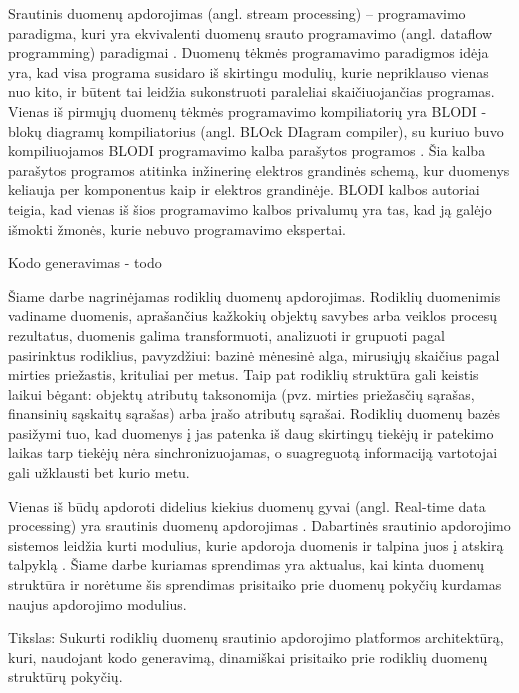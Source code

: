 \documentclass{VUMIFPSbakalaurinis}
\begin{document}
Srautinis duomenų apdorojimas (angl. stream processing) – programavimo paradigma, kuri yra ekvivalenti duomenų srauto programavimo (angl. dataflow programming) paradigmai \cite{shortstreamproc}. 
Duomenų tėkmės programavimo paradigmos idėja yra, kad visa programa susidaro iš skirtingu modulių, kurie nepriklauso vienas nuo kito, ir būtent tai leidžia sukonstruoti paraleliai skaičiuojančias programas. 
Vienas iš pirmųjų duomenų tėkmės programavimo kompiliatorių yra BLODI - blokų diagramų kompiliatorius (angl. BLOck DIagram compiler), su kuriuo buvo kompiliuojamos 
BLODI programavimo kalba parašytos programos \cite{kelly1961block}.  Šia kalba parašytos programos atitinka inžinerinę elektros grandinės schemą, 
kur duomenys keliauja per komponentus kaip ir elektros grandinėje. BLODI kalbos autoriai teigia, kad vienas iš šios programavimo kalbos privalumų yra tas, 
kad ją galėjo išmokti žmonės, kurie nebuvo programavimo ekspertai.\par
Kodo generavimas - todo \par
Šiame darbe nagrinėjamas rodiklių duomenų apdorojimas. Rodiklių duomenimis vadiname duomenis, aprašančius kažkokių objektų savybes arba veiklos procesų rezultatus, 
duomenis galima transformuoti, analizuoti ir grupuoti pagal pasirinktus rodiklius, 
pavyzdžiui: bazinė mėnesinė alga, mirusiųjų skaičius pagal mirties priežastis, krituliai per metus. Taip pat rodiklių struktūra gali keistis laikui bėgant: 
objektų atributų taksonomija (pvz. mirties priežasčių sąrašas, finansinių sąskaitų sąrašas) arba įrašo atributų sąrašai.
Rodiklių duomenų bazės pasižymi tuo, kad duomenys į jas patenka iš daug skirtingų tiekėjų ir patekimo laikas tarp tiekėjų nėra 
sinchronizuojamas, o suagreguotą informaciją vartotojai gali užklausti bet kurio metu.  \par
Vienas iš būdų apdoroti didelius kiekius duomenų gyvai (angl. Real-time data processing) yra srautinis duomenų apdorojimas \cite{BigData, StreamProcessingInData}. 
Dabartinės srautinio apdorojimo sistemos leidžia kurti modulius, kurie apdoroja duomenis ir talpina juos į atskirą talpyklą \cite{8Requirements}. 
Šiame darbe kuriamas sprendimas yra aktualus, kai kinta duomenų struktūra ir norėtume šis sprendimas prisitaiko 
prie duomenų pokyčių kurdamas naujus apdorojimo modulius.

Tikslas: Sukurti rodiklių duomenų srautinio apdorojimo platformos architektūrą, kuri, naudojant kodo generavimą, dinamiškai prisitaiko prie rodiklių duomenų struktūrų pokyčių.
\end{document}
